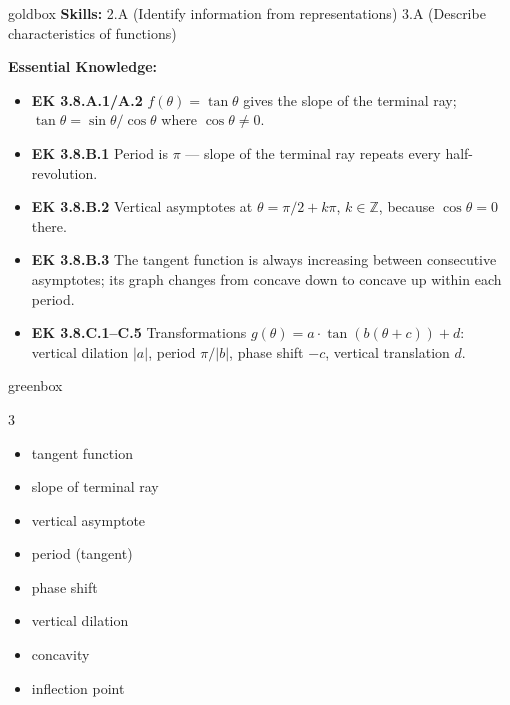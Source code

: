 \documentclass[10pt]{article}
\begin{document}
\begin{skillbox}{goldbox}
  \textbf{Skills:} 2.A (Identify information from representations) \quad
  3.A (Describe characteristics of functions)

  \medskip
  \textbf{Essential Knowledge:}
  \begin{itemize}
    \item \textbf{EK 3.8.A.1/A.2} $f(\theta)=\tan\theta$ gives the slope of the
          terminal ray; $\tan\theta = \sin\theta/\cos\theta$ where $\cos\theta\neq 0$.
    \item \textbf{EK 3.8.B.1} Period is $\pi$ --- slope of the terminal ray repeats
          every half-revolution.
    \item \textbf{EK 3.8.B.2} Vertical asymptotes at $\theta = \pi/2 + k\pi$,
          $k\in\mathbb{Z}$, because $\cos\theta=0$ there.
    \item \textbf{EK 3.8.B.3} The tangent function is always increasing between
          consecutive asymptotes; its graph changes from concave down to concave
          up within each period.
    \item \textbf{EK 3.8.C.1--C.5} Transformations $g(\theta) = a\cdot\tan(b(\theta+c))+d$:
          vertical dilation $|a|$, period $\pi/|b|$, phase shift $-c$, vertical
          translation $d$.
  \end{itemize}
\end{skillbox}

\begin{skillbox}{greenbox}
  \begin{multicols}{3}
  \begin{itemize}
    \item tangent function
    \item slope of terminal ray
    \item vertical asymptote
    \item period (tangent)
    \item phase shift
    \item vertical dilation
    \item concavity
    \item inflection point
  \end{itemize}
  \end{multicols}
\end{skillbox}
\end{document}
